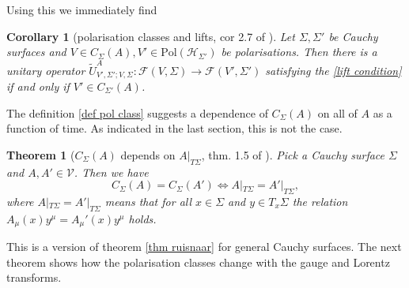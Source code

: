 \documentclass[b5paper,draft,openbib,12pt]{memoir}
\newtheorem{Thm}[Def]{Theorem}
\newtheorem{Corollary}[Def]{Corollary}
\begin{document}
Using this we immediately find 
\begin{Corollary}[polarisation classes and lifts, cor 2.7 of \cite{deckert2016perspective}]\label{cor: pol class lift}
Let \(\Sigma, \Sigma'\) be Cauchy surfaces and 
\(V\in C_\Sigma(A), V'\in \text{Pol}(\mathcal{H}_{\Sigma'})\) be 
polarisations. Then there is a unitary operator 
\(\tilde{U}^A_{V',\Sigma'; V,\Sigma}:\mathcal{F}(V,\Sigma)
\rightarrow \mathcal{F}(V',\Sigma')\) satisfying the
\eqref{lift condition} if and only if 
\(V'\in C_{\Sigma'}(A)\).
\end{Corollary}

The definition \ref{def pol class} suggests a dependence of 
\(C_{\Sigma}(A)\) on all of \(A\) as a function of time. 
As indicated in the last section,
this is not the case.

\begin{Thm}[\(C_{\Sigma}(A)\) depends on \(A|_{T\Sigma}\), thm. 1.5 of \cite{ivp2}]\label{thm: pol class history}
Pick a Cauchy surface \(\Sigma\) and \(A,A'\in \mathcal{V}\). 
Then we have 
\begin{equation}
  C_{\Sigma}(A)=C_{\Sigma}(A') \iff A|_{T\Sigma}=A'|_{T\Sigma},
\end{equation}
where \(A|_{T\Sigma}=A'|_{T\Sigma}\) means that for all \(x\in \Sigma\)
and \(y\in T_x\Sigma\) the relation 
\(A_\mu(x) y^\mu=A_\mu'(x) y^\mu\) holds. 
\end{Thm}

This is a version of theorem \ref{thm ruisnaar} for general 
Cauchy surfaces.
The next theorem shows how the polarisation classes change 
with the gauge and Lorentz transforms.
\end{document}
